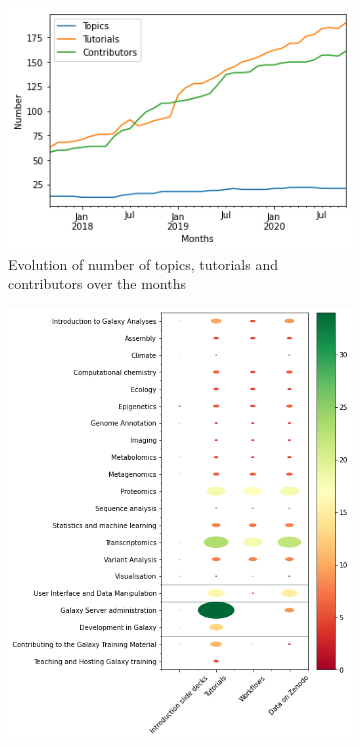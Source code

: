 \documentclass[10pt,letterpaper]{article}
\begin{document}
\begin{figure}[!ht]
    \centering
    \begin{subfigure}[b]{0.5\textwidth}
         \centering
         \includegraphics[width=\textwidth]{images/training-material-evolutions.png}
    \caption{Evolution of number of topics, tutorials and contributors over the months}
         \label{fig:material-evolution}
    \end{subfigure}
    \hfill
    \begin{subfigure}[b]{0.4\textwidth}
         \centering
         \includegraphics[width=\textwidth]{images/training-material-number.png}

\end{subfigure}
\end{figure}
\end{document}

